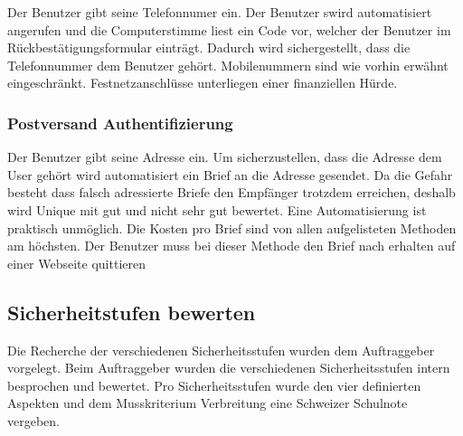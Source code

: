 Der Benutzer gibt seine Telefonnumer ein. Der Benutzer swird
automatisiert angerufen und die Computerstimme liest ein Code vor,
welcher der Benutzer im Rückbestätigungsformular einträgt. Dadurch wird
sichergestellt, dass die Telefonnummer dem Benutzer gehört.
Mobilenummern sind wie vorhin erwähnt eingeschränkt. Festnetzanschlüsse
unterliegen einer finanziellen Hürde.

\subsubsection{Postversand
Authentifizierung}\label{postversand-authentifizierung}

Der Benutzer gibt seine Adresse ein. Um sicherzustellen, dass die
Adresse dem User gehört wird automatisiert ein Brief an die Adresse
gesendet. Da die Gefahr besteht dass falsch adressierte Briefe den
Empfänger trotzdem erreichen, deshalb wird Unique mit gut und nicht sehr
gut bewertet. Eine Automatisierung ist praktisch unmöglich. Die Kosten
pro Brief sind von allen aufgelisteten Methoden am höchsten. Der
Benutzer muss bei dieser Methode den Brief nach erhalten auf einer
Webseite quittieren

\subsection{Sicherheitstufen bewerten}\label{sicherheitstufen-bewerten}

Die Recherche der verschiedenen Sicherheitsstufen wurden dem
Auftraggeber vorgelegt. Beim Auftraggeber wurden die verschiedenen
Sicherheitsstufen intern besprochen und bewertet. Pro Sicherheitsstufen
wurde den vier definierten Aspekten und dem Musskriterium Verbreitung
eine Schweizer Schulnote vergeben.

